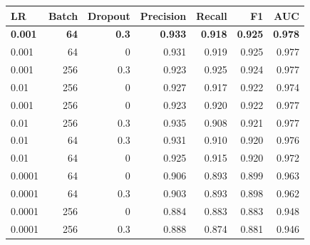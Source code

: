 \begin{tabular}{lrrrrrr}
\toprule
LR & Batch & Dropout & Precision & Recall & F1 & AUC \\
\midrule
\textbf{0.001} & \textbf{64} & \textbf{0.3} & \textbf{0.933} & \textbf{0.918} & \textbf{0.925} & \textbf{0.978} \\
0.001 & 64 & 0 & 0.931 & 0.919 & 0.925 & 0.977 \\
0.001 & 256 & 0.3 & 0.923 & 0.925 & 0.924 & 0.977 \\
0.01 & 256 & 0 & 0.927 & 0.917 & 0.922 & 0.974 \\
0.001 & 256 & 0 & 0.923 & 0.920 & 0.922 & 0.977 \\
0.01 & 256 & 0.3 & 0.935 & 0.908 & 0.921 & 0.977 \\
0.01 & 64 & 0.3 & 0.931 & 0.910 & 0.920 & 0.976 \\
0.01 & 64 & 0 & 0.925 & 0.915 & 0.920 & 0.972 \\
0.0001 & 64 & 0 & 0.906 & 0.893 & 0.899 & 0.963 \\
0.0001 & 64 & 0.3 & 0.903 & 0.893 & 0.898 & 0.962 \\
0.0001 & 256 & 0 & 0.884 & 0.883 & 0.883 & 0.948 \\
0.0001 & 256 & 0.3 & 0.888 & 0.874 & 0.881 & 0.946 \\
\bottomrule
\end{tabular}
